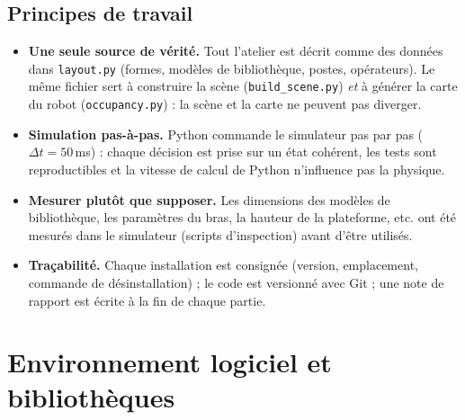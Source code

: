\documentclass[11pt,a4paper]{article}
\newcommand{\code}[1]{\texttt{#1}}
\begin{document}
\subsection{Principes de travail}
\begin{itemize}
  \item \textbf{Une seule source de vérité.} Tout l'atelier est décrit comme des données dans
        \code{layout.py} (formes, modèles de bibliothèque, postes, opérateurs). Le même fichier sert
        à construire la scène (\code{build\_scene.py}) \emph{et} à générer la carte du robot
        (\code{occupancy.py}) : la scène et la carte ne peuvent pas diverger.
  \item \textbf{Simulation pas-à-pas.} Python commande le simulateur pas par pas
        ($\Delta t = 50$\,ms) : chaque décision est prise sur un état cohérent, les tests sont
        reproductibles et la vitesse de calcul de Python n'influence pas la physique.
  \item \textbf{Mesurer plutôt que supposer.} Les dimensions des modèles de bibliothèque, les
        paramètres du bras, la hauteur de la plateforme, etc. ont été mesurés dans le simulateur
        (scripts d'inspection) avant d'être utilisés.
  \item \textbf{Traçabilité.} Chaque installation est consignée (version, emplacement, commande de
        désinstallation) ; le code est versionné avec Git ; une note de rapport est écrite à la fin
        de chaque partie.
\end{itemize}

\section{Environnement logiciel et bibliothèques}
\end{document}
